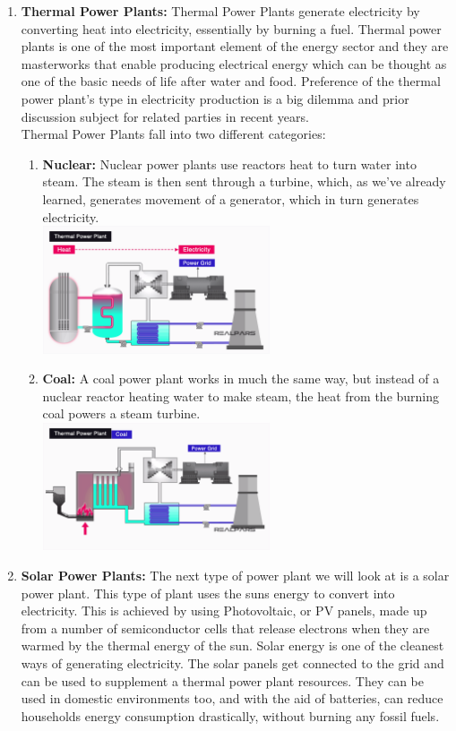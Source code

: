 \documentclass[11 pt]{article}
\begin{document}
\begin{enumerate}
		\pagebreak
		
	\item \textbf{Thermal Power Plants: }Thermal Power Plants generate electricity by converting heat into electricity, essentially by burning a fuel. Thermal power plants is one of the most important element of the energy sector and they are masterworks that enable producing electrical energy which can be thought as one of the basic needs of life after water and food. Preference of the thermal power plant's type in electricity production is a big dilemma and prior discussion subject for related parties in recent years.\\
	Thermal Power Plants fall into two different categories:
		\begin{enumerate}
			\item \textbf{Nuclear:} Nuclear power plants use reactors heat to turn water into steam. The steam is then sent through a turbine, which, as we’ve already learned, generates movement of a generator, which in turn generates electricity.\\
			\includegraphics[width=190pt]{Gallery/Nuclear-Power-Plants.png} 
			\item \textbf{Coal:} A coal power plant works in much the same way, but instead of a nuclear reactor heating water to make steam, the heat from the burning coal powers a steam turbine.\\
			\includegraphics[width=190pt]{Gallery/Coal-Power-Plants.png} 
		\end{enumerate}
	\item \textbf{Solar Power Plants: }The next type of power plant we will look at is a solar power plant. This type of plant uses the suns energy to convert into electricity. This is achieved by using Photovoltaic, or PV panels, made up from a number of semiconductor cells that release electrons when they are warmed by the thermal energy of the sun. Solar energy is one of the cleanest ways of generating electricity. The solar panels get connected to the grid and can be used to supplement a thermal power plant resources. They can be used in domestic environments too, and with the aid of batteries, can reduce households energy consumption drastically, without burning any fossil fuels.\\

\end{enumerate}
\end{document}
